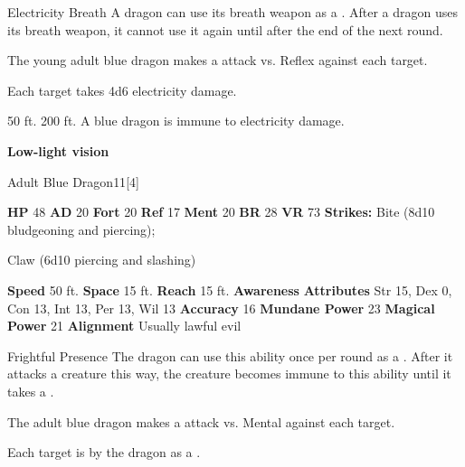     \begin{freeability}{Electricity Breath}
      A dragon can use its breath weapon as a .
      After a dragon uses its breath weapon, it cannot use it again until after the end of the next round.
      \par The young adult blue dragon makes a  attack
        vs. Reflex against each target.
    
    \hit Each target takes 4d6 electricity damage.
    \end{freeability}
  
      
       50 ft.
     200 ft.
     A blue dragon is immune to electricity damage.
    \par\noindent\textbf{Low-light vision}
  

  \begin{monsubsection}{Adult Blue Dragon}{11}[4]
    \vspace{-1em}\vspace{-1em}
    \vspace{0em}

    
    

    \begin{spellcontent}
      \begin{spelltargetinginfo}
        \pari \textbf{HP} 48 \monsep
          \textbf{AD} 20 \monsep
          \textbf{Fort} 20 \monsep
          \textbf{Ref} 17 \monsep
          \textbf{Ment} 20
        \pari \textbf{BR} 28 \monsep
        \textbf{VR} 73
        \pari \textbf{Strikes:}
            Bite  (8d10 bludgeoning and piercing);
\par Claw  (6d10 piercing and slashing)
      \end{spelltargetinginfo}
    \end{spellcontent}
    \begin{monsterfooter}
      \pari \textbf{Speed} 50 ft. \monsep
        \textbf{Space} 15 ft. \monsep
        \textbf{Reach} 15 ft.
      \pari \textbf{Awareness} 
      \pari \textbf{Attributes}
        Str 15, Dex 0,
        Con 13, Int 13,
        Per 13, Wil 13
      \pari \textbf{Accuracy} 16 \monsep
        \textbf{Mundane Power} 23 \monsep
      \textbf{Magical Power} 21
      \pari \textbf{Alignment} Usually lawful evil
    \end{monsterfooter}
  \end{monsubsection}
  \begin{freeability}{Frightful Presence}
      The dragon can use this ability once per round as a .
      After it attacks a creature this way, the creature becomes immune to this ability until it takes a .
      \par The adult blue dragon makes a  attack
        vs. Mental against each target.
    
    \hit Each target is  by the dragon as a .
    \end{freeability}
  

